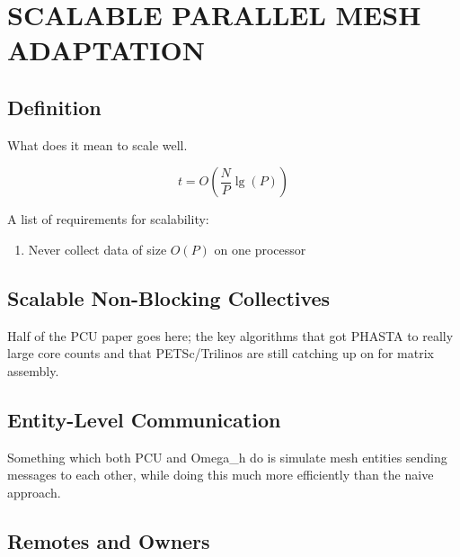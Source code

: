 
\chapter{SCALABLE PARALLEL MESH ADAPTATION}
\label{chap:parallel}

\section{Definition}

What does it mean to scale well.

\begin{equation} \label{eq:big-o-scale}
t = O\left(\frac{N}{P}\lg(P)\right)
\end{equation}

A list of requirements for scalability:

\begin{enumerate}
\item Never collect data of size $O(P)$ on one processor
\end{enumerate}

\section{Scalable Non-Blocking Collectives}
\label{sec:nbx}

Half of the PCU paper goes here; the key algorithms
that got PHASTA to really large core counts and
that PETSc/Trilinos are still catching up on for
matrix assembly.

\section{Entity-Level Communication}
\label{sec:dist}

Something which both PCU and Omega\_h do is simulate
mesh entities sending messages to each other, while
doing this much more efficiently than the naive approach.

\section{Remotes and Owners}

